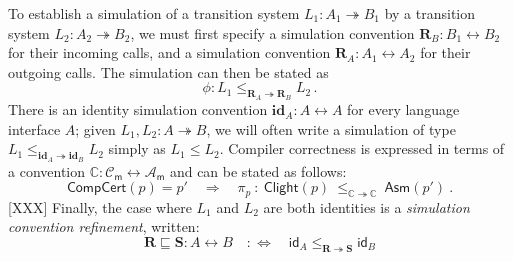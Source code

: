 \documentclass[acmsmall,screen,review,anonymous,nonacm]{acmart}
\newcommand{\kw}[1]{\ensuremath{ \mathsf{#1} }}
\newcommand{\idsc}{\mathbf{id}} %
\begin{document}
To establish a simulation
of a transition system $L_1: A_1 \twoheadrightarrow B_1$
by a transition system $L_2: A_2 \twoheadrightarrow B_2$,
we must first specify a simulation convention
$\mathbf{R}_B : B_1 \leftrightarrow B_2$
for their incoming calls,
and a simulation convention
$\mathbf{R}_A : A_1 \leftrightarrow A_2$
for their outgoing calls.
The simulation can then be stated as
\[
  \phi : L_1 \le_{\mathbf{R}_A \twoheadrightarrow \mathbf{R}_B} L_2
  \,.
\]
There is an identity simulation convention $\idsc_A : A \leftrightarrow A$
for every language interface $A$;
given $L_1, L_2 : A \twoheadrightarrow B$,
we will often write
a simulation of type $L_1 \le_{\idsc_A \twoheadrightarrow \idsc_B} L_2$
simply as $L_1 \le L_2$.
%
Compiler correctness
is expressed in terms of a convention
$\mathbb{C} : \mathcal{C}_\kw{m} \leftrightarrow \mathcal{A}_\kw{m}$
and can be stated as follows:
\[
  \kw{CompCert}(p) = p'
  \quad \Rightarrow \quad
  \pi_p \::\:
  \kw{Clight}(p)
  \:\le_{\mathbb{C} \twoheadrightarrow \mathbb{C}}\:
  \kw{Asm}(p')
  \:.
\]
[XXX]
Finally, the case where $L_1$ and $L_2$ are both identities
is a \emph{simulation convention refinement}, written:
\[
  \mathbf{R} \sqsubseteq \mathbf{S} : A \leftrightarrow B
  \quad :\Leftrightarrow \quad
  \kw{id}_A \le_{\mathbf{R} \twoheadrightarrow \mathbf{S}} \kw{id}_B
\]

\end{document}
